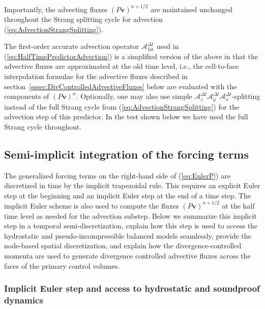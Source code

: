 \documentclass{ametsoc}
\newcommand{\sblue}[1]{\textcolor{sblue}{#1}}
\newcommand{\revision}[1]{\sblue{#1}}
\theoremstyle{definition}
\newcommand{\eq}[1]{(\ref{#1})}
\newcommand{\vect}[1]{{\mathbf{#1}}}
\newcommand{\vv}{\vect{v}}
\newcommand{\half}{1/2}
\newcommand{\dt}{\Delta t}
\begin{document}
Importantly, the advecting fluxes $(P\vv)^{n+\half}$ are maintained unchanged 
throughout the Strang splitting cycle \revision{for advection} \eq{eq:AdvectionStrangSplitting}.

The first-order accurate advection operator $\mathcal{A}_{1\text{st}}^{\dt}$
used in \eq{eq:HalfTimePredictorAdvection} is a simplified version
of the above in that the advective fluxes are approximated at the old time level,
i.e., the cell-to-face interpolation formulae for the advective fluxes described
in section~\ref{sssec:DivControlledAdvectiveFluxes} below are evaluated with the
components of $(P\vv)^n$. Optionally, one may also use simple 
$\mathcal{A}^{\dt}_z \mathcal{A}^{\dt}_y\mathcal{A}^{\dt}_x$-splitting instead of
the full Strang cycle from \eq{eq:AdvectionStrangSplitting} for the advection step 
of this predictor. In the test shown below we have used the \revision{full} Strang 
cycle throughout. 


\subsection{Semi-implicit integration of the forcing terms}
\label{ssec:SemiImplicitForcing}

The generalized forcing terms on the right-hand side of \eq{eq:EulerP} are 
discretized in time by the implicit trapezoidal rule. This requires an explicit 
Euler step at the beginning and an implicit Euler step at the end of a time step. 
The implicit Euler scheme is also used to compute the fluxes $(P\vv)^{n+\half}$ 
at the half time level as needed for the advection substep. Below we summarize this 
implicit step in a temporal semi-discretization, explain how this step is used
to access the hydrostatic and pseudo-incompressible balanced models seamlessly, 
provide the node-based spatial discretization, and explain how the 
divergence-controlled momenta are used to generate divergence controlled advective 
fluxes across the faces of the primary control volumes.


\subsubsection{Implicit Euler step and access to hydrostatic and soundproof dynamics}
\label{sssec:ImplicitEuler}
\end{document}
